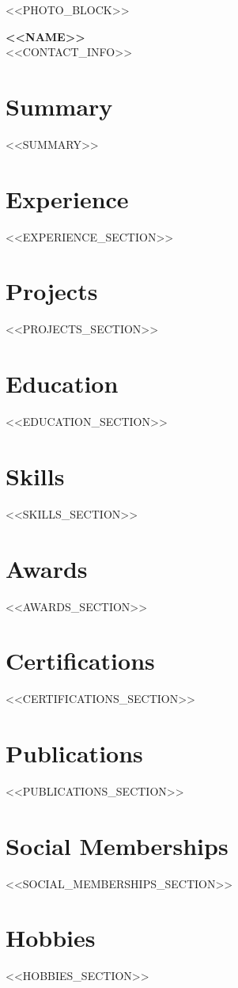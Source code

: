 \documentclass[<<FONT_SIZE>>,a4paper]{article}
\begin{document}
\begin{flushleft}
    <<PHOTO_BLOCK>>
    \vspace{2mm}
    
    {\Huge \textbf{<<NAME>>}} \\
    \vspace{2mm}
    <<CONTACT_INFO>>
\end{flushleft}

\vspace{6mm}

\section*{Summary}
<<SUMMARY>>

\section*{Experience}
<<EXPERIENCE_SECTION>>

\section*{Projects}
<<PROJECTS_SECTION>>

\section*{Education}
<<EDUCATION_SECTION>>

\section*{Skills}
<<SKILLS_SECTION>>

\section*{Awards}
<<AWARDS_SECTION>>

\section*{Certifications}
<<CERTIFICATIONS_SECTION>>

\section*{Publications}
<<PUBLICATIONS_SECTION>>

\section*{Social Memberships}
<<SOCIAL_MEMBERSHIPS_SECTION>>

\section*{Hobbies}
<<HOBBIES_SECTION>>
\end{document}

